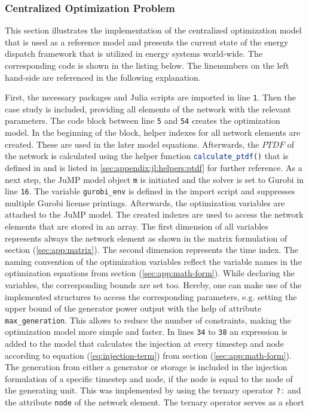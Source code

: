 \subsubsection{Centralized Optimization Problem}

This section illustrates the implementation of the centralized optimization model that is used as a reference model and presents the current state of the energy dispatch framework that is utilized in energy systems world-wide. The corresponding code is shown in the listing below. The linenumbers on the left hand-side are referenced in the following explanation.



First, the necessary packages and Julia scripts are imported in line \texttt{1}. Then the case study is included, providing all elements of the network with the relevant parameters. The code block between line \texttt{5} and \texttt{54} creates the optimization model. In the beginning of the block, helper indexes for all network elements are created. These are used in the later model equations. Afterwards, the $PTDF$ of the network is calculated using the helper function \lstinline[language=julia]{calculate_ptdf()} that is defined in  and is listed in \ref{sec:appendix:jl:helpers:ptdf} for further reference.  As a next step, the JuMP model object \lstinline[language=julia]{m} is initiated and the solver is set to Gurobi in line \texttt{16}. The variable \lstinline[language=julia]{gurobi_env} is defined in the import script  and suppresses multiple Gurobi license printings. Afterwards, the optimization variables are attached to the JuMP model. The created indexes are used to access the network elements that are stored in an array. The first dimension of all variables represents always the network element as shown in the matrix formulation of section (\ref{sec:app:matrix}). The second dimension represents the time index. The naming convention of the optimization variables reflect the variable names in the optimization equations from section (\ref{sec:app:math-form}). While declaring the variables, the corresponding bounds are set too. Hereby, one can make use of the implemented structures to access the corresponding parameters, e.g. setting the upper bound of the generator power output with the help of attribute \lstinline[language=julia]{max_generation}. This allows to reduce the number of constraints, making the optimization model more simple and faster. In lines \texttt{34} to \texttt{38} an expression is added to the model that calculates the injection at every timestep and node according to equation (\ref{eq:injection-term}) from section (\ref{sec:app:math-form}). The generation from either a generator or storage is included in the injection formulation of a specific timestep and node, if the node is equal to the node of the generating unit. This was implemented by using the ternary operator \lstinline[language=julia]{?:} and the attribute \lstinline[language=julia]{node} of the network element. The ternary operator serves as a short 